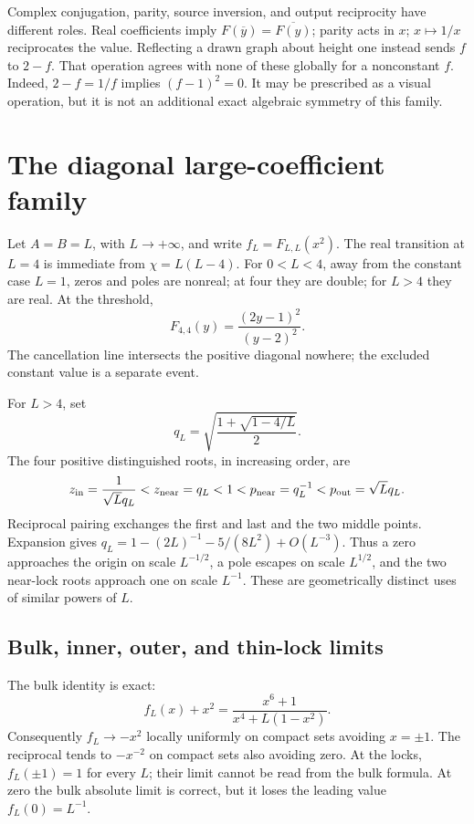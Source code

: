 Complex conjugation, parity, source inversion, and output reciprocity have different roles. Real coefficients imply \(F(\overline y)=\overline{F(y)}\); parity acts in \(x\); \(x\mapsto1/x\) reciprocates the value. Reflecting a drawn graph about height one instead sends \(f\) to \(2-f\). That operation agrees with none of these globally for a nonconstant \(f\). Indeed, \(2-f=1/f\) implies \((f-1)^2=0\). It may be prescribed as a visual operation, but it is not an additional exact algebraic symmetry of this family.

\section{The diagonal large-coefficient family}\label{sec:scaling}

Let \(A=B=L\), with \(L\to+\infty\), and write \(f_L=F_{L,L}(x^2)\). The real transition at \(L=4\) is immediate from \(\chi=L(L-4)\). For \(0<L<4\), away from the constant case \(L=1\), zeros and poles are nonreal; at four they are double; for \(L>4\) they are real. At the threshold,
\[
F_{4,4}(y)=\frac{(2y-1)^2}{(y-2)^2}.
\]
The cancellation line intersects the positive diagonal nowhere; the excluded constant value is a separate event.

For \(L>4\), set
\[
q_L=\sqrt{\frac{1+\sqrt{1-4/L}}2}.
\]
The four positive distinguished roots, in increasing order, are
\begin{equation}\label{eq:Lroots}
z_{\rm in}=\frac1{\sqrt Lq_L}<z_{\rm near}=q_L<1<
p_{\rm near}=q_L^{-1}<p_{\rm out}=\sqrt Lq_L.
\end{equation}
Reciprocal pairing exchanges the first and last and the two middle points. Expansion gives \(q_L=1-(2L)^{-1}-5/(8L^2)+O(L^{-3})\). Thus a zero approaches the origin on scale \(L^{-1/2}\), a pole escapes on scale \(L^{1/2}\), and the two near-lock roots approach one on scale \(L^{-1}\). These are geometrically distinct uses of similar powers of \(L\).

\subsection{Bulk, inner, outer, and thin-lock limits}
The bulk identity is exact:
\begin{equation}\label{eq:bulk}
f_L(x)+x^2=\frac{x^6+1}{x^4+L(1-x^2)}.
\end{equation}
Consequently \(f_L\to-x^2\) locally uniformly on compact sets avoiding \(x=\pm1\). The reciprocal tends to \(-x^{-2}\) on compact sets also avoiding zero. At the locks, \(f_L(\pm1)=1\) for every \(L\); their limit cannot be read from the bulk formula. At zero the bulk absolute limit is correct, but it loses the leading value \(f_L(0)=L^{-1}\).

